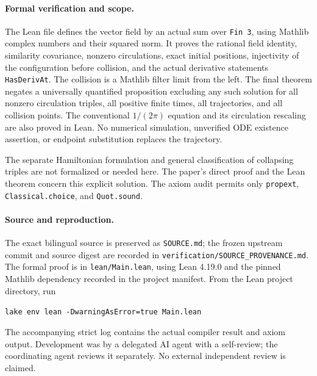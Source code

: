 \documentclass[11pt]{article}
\begin{document}
\paragraph{Formal verification and scope.}
The Lean file defines the vector field by an actual sum over
\texttt{Fin 3}, using Mathlib complex numbers and their squared norm.
It proves the rational field identity, similarity covariance,
nonzero circulations, exact initial positions, injectivity of the
configuration before collision, and the actual derivative statements
\texttt{HasDerivAt}. The collision is a Mathlib filter limit from the
left. The final theorem negates a universally quantified proposition
excluding any such solution for all nonzero circulation triples,
all positive finite times, all trajectories, and all collision points.
The conventional $1/(2\pi)$ equation and its circulation rescaling
are also proved in Lean. No numerical simulation, unverified ODE
existence assertion, or endpoint substitution replaces the trajectory.

The separate Hamiltonian formulation and general classification of
collapsing triples are not formalized or needed here. The paper's
direct proof and the Lean theorem concern this explicit solution.
The axiom audit permits only \texttt{propext},
\texttt{Classical.choice}, and \texttt{Quot.sound}.

\paragraph{Source and reproduction.}
The exact bilingual source is preserved as \texttt{SOURCE.md}; the
frozen upstream commit and source digest are recorded in
\texttt{verification/SOURCE\_PROVENANCE.md}.
The formal proof is in \texttt{lean/Main.lean}, using Lean 4.19.0 and
the pinned Mathlib dependency recorded in the project manifest.
From the Lean project directory, run
\begin{center}\texttt{lake env lean -DwarningAsError=true Main.lean}\end{center}
The accompanying strict log contains the actual compiler result and
axiom output. Development was by a delegated AI agent with a
self-review; the coordinating agent reviews it separately. No external
independent review is claimed.
\end{document}
